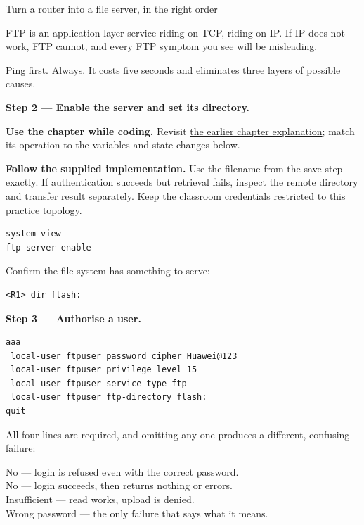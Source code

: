 \begin{labproject}{Turn a router into a file server, in the right order}
\begin{keyidea}
FTP is an application-layer service riding on TCP, riding on IP. If IP does not work, FTP cannot, and every FTP symptom you see will be misleading.

Ping first. Always. It costs five seconds and eliminates three layers of possible causes.
\end{keyidea}

\medskip\noindent\textbf{Step 2 --- Enable the server and set its directory.}\par




\textbf{Use the chapter while coding.} Revisit \hyperref[ch:ftp]{the earlier chapter explanation}; match its operation to the variables and state changes below.

\textbf{Follow the supplied implementation.} Use the filename from the save step exactly. If authentication succeeds but retrieval fails, inspect the remote directory and transfer result separately. Keep the classroom credentials restricted to this practice topology.


\begin{lstlisting}[style=utpterminal]
system-view
ftp server enable
\end{lstlisting}

Confirm the file system has something to serve:

\begin{lstlisting}[style=utpterminal]
<R1> dir flash:
\end{lstlisting}

\medskip\noindent\textbf{Step 3 --- Authorise a user.}\par

\begin{lstlisting}[style=utpterminal]
aaa
 local-user ftpuser password cipher Huawei@123
 local-user ftpuser privilege level 15
 local-user ftpuser service-type ftp
 local-user ftpuser ftp-directory flash:
quit
\end{lstlisting}

\begin{pitfall}
All four  lines are required, and omitting any one produces a different, confusing failure:

No  --- login is refused even with the correct password.\\
No  --- login succeeds, then  returns nothing or errors.\\
Insufficient  --- read works, upload is denied.\\
Wrong password --- the only failure that says what it means.


\end{pitfall}
\end{labproject}
